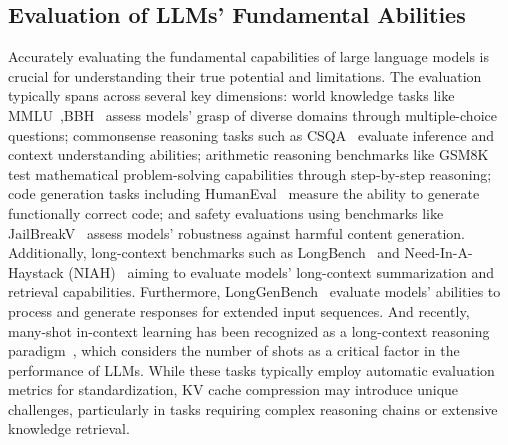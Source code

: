 \subsection{Evaluation of LLMs' Fundamental Abilities}
Accurately evaluating the fundamental capabilities of large language models is crucial for understanding their true potential and limitations. The evaluation typically spans across several key dimensions: world knowledge tasks like MMLU~\cite{mmlu},BBH~\cite{bbh} assess models' grasp of diverse domains through multiple-choice questions; commonsense reasoning tasks such as CSQA~\cite{csqa} evaluate inference and context understanding abilities; arithmetic reasoning benchmarks like GSM8K~\cite{gsm8k} test mathematical problem-solving capabilities through step-by-step reasoning; code generation tasks including HumanEval~\cite{chen2021evaluating} measure the ability to generate functionally correct code; and safety evaluations using benchmarks like JailBreakV~\cite{luo2024jailbreakv} assess models' robustness against harmful content generation. Additionally, long-context benchmarks such as LongBench~\cite{longbench,longbenchv2} and Need-In-A-Haystack (NIAH)~\cite{needle} aiming to evaluate models' long-context summarization and retrieval capabilities. Furthermore, LongGenBench~\cite{longgenbench} evaluate models' abilities to process and generate responses for extended input sequences. And recently, many-shot in-context learning has been recognized as a long-context reasoning paradigm~\cite{agarwal2024many}, which considers the number of shots as a critical factor in the performance of LLMs.
While these tasks typically employ automatic evaluation metrics for standardization, KV cache compression may introduce unique challenges, particularly in tasks requiring complex reasoning chains or extensive knowledge retrieval.



